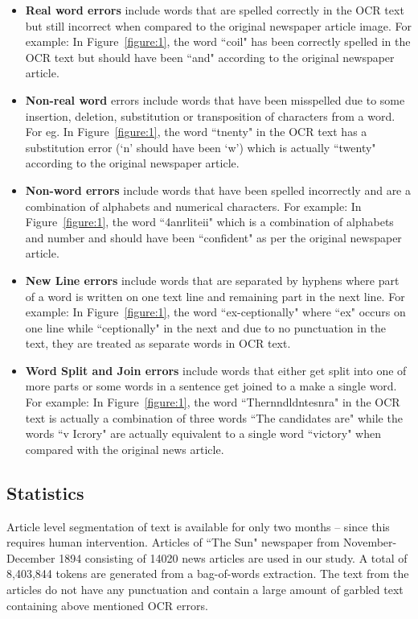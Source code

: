\begin{itemize}
 \item \textbf{Real word errors}	 include words that are spelled correctly in the OCR text but still incorrect when compared to the original newspaper article image. For example: In Figure~\ref{figure:1}, the word ``coil"  has been correctly spelled in the OCR text  but should have been ``and" according to the original newspaper article. 
 \item \textbf{Non-real word} errors include words that have been misspelled due to some insertion, deletion, substitution or transposition of characters from a word. For eg. In Figure~\ref{figure:1}, the word ``tnenty" in the OCR text has a substitution error (`n' should have been `w') which is actually ``twenty" according to the original newspaper article.
 \item \textbf{Non-word errors} include words that have been spelled incorrectly and are a combination of alphabets and numerical characters. For example: In Figure~\ref{figure:1}, the word ``4anrliteii" which is a combination of alphabets and number and should have been ``confident" as per the original newspaper article.
\item \textbf{New Line errors} include words that are separated by hyphens where part of a word is written on one text line and remaining part in the next line. For example: In Figure~\ref{figure:1}, the word ``ex-ceptionally" where ``ex" occurs on one line while ``ceptionally" in the next and due to no punctuation in the text, they are treated as separate words in OCR text.
\item \textbf{Word Split and Join errors} include words that either get split into one of more parts or some words in a sentence get joined to a make a single word. For example: In Figure~\ref{figure:1}, the word ``Thernndldntesnra" in the OCR text is actually a combination of three words ``The candidates are" while the words ``v Icrory" are actually equivalent to a single word ``victory" when compared with the original news article.
\end{itemize} 

\subsection{Statistics}
Article level segmentation of text is available for only two months -- since this requires human intervention. Articles of ``The Sun" newspaper from November-December 1894 consisting of 14020 news articles are used in our study. A total of 8,403,844 tokens are generated from a bag-of-words extraction. 
The text from the articles do not have any punctuation and contain a large amount of garbled text containing above mentioned OCR errors.


